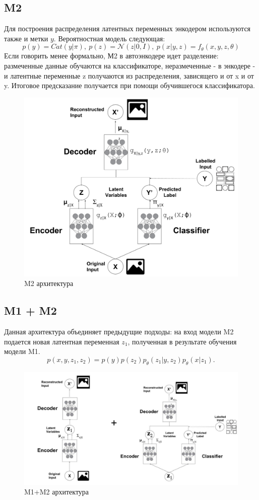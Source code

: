 \documentclass{article}
\begin{document}
\subsection{M2}
Для построения распределения латентных переменных энкодером используются также и метки $y$. Вероятностная модель следующая:
$$
p(y)=Cat(y|\pi), \ 
p(z)=\mathcal{N}(z | 0, I) , \
p(x|y, z)=f_\theta(x, y, z, \theta)
$$
Если говорить менее формально, М2 в автоэнкодере идет разделение: размеченные данные обучаются на классификаторе, неразмеченные - в энкодере - и латентные переменные z получаются из распределения, зависящего и от x и от y. Итоговое предсказание получается при помощи обучившегося классификатора.
\begin{figure}[htbp]
    \centering
    \includegraphics[scale=0.4]{m2}
    \caption{M2 архитектура}
\end{figure}
\subsection{M1 + M2}
Данная архитектура объединяет предыдущие подходы: на вход модели M2 подается новая латентная переменная $z_1$, полученная в результате обучения модели M1.
$$
p(x, y, z_1, z_2)=p(y)p(z_2)p_\theta(z_1|y, z_2)p_\theta(x|z_1).
$$
\begin{figure}[htbp]
    \centering
    \includegraphics[scale=0.3]{m1+m2}
    \caption{M1+M2 архитектура}
\end{figure}
\end{document}
